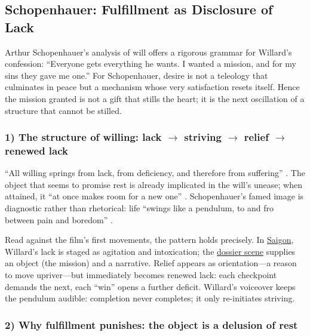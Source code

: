 \subsection*{Schopenhauer: Fulfillment as Disclosure of Lack}
\label{ssec:iii-schopenhauer}
Arthur Schopenhauer's analysis of will offers a rigorous grammar for Willard's confession:
``Everyone gets everything he wants. I wanted a mission, and for my sins they gave me one.''
For Schopenhauer, desire is not a teleology that culminates in peace but a mechanism whose
very satisfaction resets itself. Hence the mission granted is not a gift that stills the heart;
it is the next oscillation of a structure that cannot be stilled.

\subsubsection*{1) The structure of willing: lack $\rightarrow$ striving
	$\rightarrow$ relief $\rightarrow$ renewed lack}

``All willing springs from lack, from deficiency, and therefore from suffering''
\parencite[p.~196]{SchopenhauerWWR1969}. The object that seems to promise rest is already
implicated in the will's unease; when attained, it ``at once makes room for a new one''
\parencite[p.~319]{SchopenhauerWWR1969}. Schopenhauer's famed image is diagnostic rather
than rhetorical: life ``swings like a pendulum, to and fro between pain and boredom''
\parencite[p.~312]{SchopenhauerWWR1969}.

Read against the film's first movements, the pattern holds precisely. In
\hyperref[scene:saigon-opening]{Saigon}, Willard's lack is staged as agitation and
intoxication; the \hyperref[scene:briefing]{dossier scene} supplies an object (the mission)
and a narrative. Relief appears as orientation—a reason to move upriver—but immediately becomes
renewed lack: each checkpoint demands the next, each ``win'' opens a further deficit.
Willard's voiceover keeps the pendulum audible: completion never completes; it only
re-initiates striving.

\subsubsection*{2) Why fulfillment punishes: the object is a delusion of rest}

